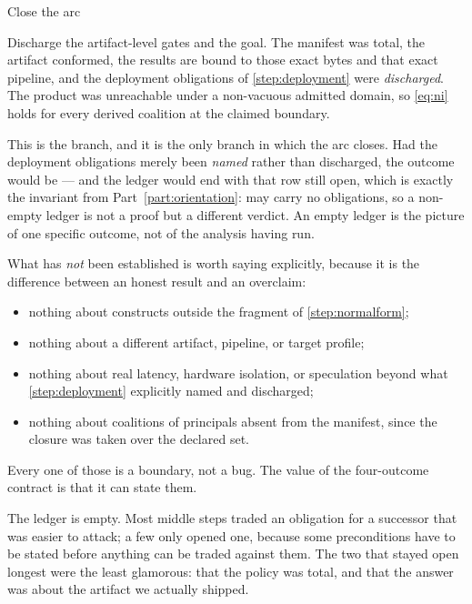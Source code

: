 \begin{step}{Close the arc}{%
}
\label{step:close}

Discharge the artifact-level gates and the goal. The manifest was total, the
artifact conformed, the results are bound to those exact bytes and that exact
pipeline, and the deployment obligations of \cref{step:deployment} were
\emph{discharged}. The product was unreachable under a non-vacuous admitted
domain, so \eqref{eq:ni} holds for every derived coalition at the claimed
boundary.

This is the \Verified{} branch, and it is the only branch in which the arc closes.
Had the deployment obligations merely been \emph{named} rather than discharged,
the outcome would be \Conditional{} --- and the ledger would end with that row
still open, which is exactly the invariant from Part~\ref{part:orientation}:
\Verified{} may carry no obligations, so a non-empty ledger is not a proof but a
different verdict. An empty ledger is the picture of one specific outcome, not of
the analysis having run.

What has \emph{not} been established is worth saying explicitly, because it is
the difference between an honest result and an overclaim:

\begin{itemize}[nosep,leftmargin=1.4em]
\item nothing about constructs outside the fragment of \cref{step:normalform};
\item nothing about a different artifact, pipeline, or target profile;
\item nothing about real latency, hardware isolation, or speculation beyond what
      \cref{step:deployment} explicitly named and discharged;
\item nothing about coalitions of principals absent from the manifest, since the
      closure was taken over the declared set.
\end{itemize}

Every one of those is a boundary, not a bug. The value of the four-outcome
contract is that it can state them.
\end{step}

\clgboard

\noindent
The ledger is empty. Most middle steps traded an obligation for a successor that
was easier to attack; a few only opened one, because some preconditions have to
be stated before anything can be traded against them. The two that stayed open
longest were the least glamorous: that the policy was total, and that the answer
was about the artifact we actually shipped.
